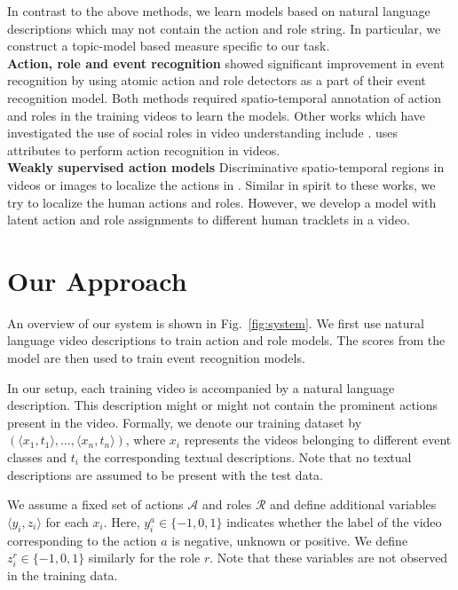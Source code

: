 \documentclass[10pt,twocolumn,letterpaper]{article}
\begin{document}
In contrast to the above methods, we learn models based on natural language
descriptions which may not contain the action and role string. In particular, we
construct a topic-model based measure specific to our task.
\\
\noindent \textbf{Action, role and event recognition} \cite{Izadinia_ECCV12,
Lan_CVPR12} showed significant improvement in event recognition by using atomic
action and role detectors as a part of their event recognition model. Both
methods required spatio-temporal annotation of action and roles in the
training videos to learn the models. Other works which have investigated the
use of social roles in video understanding include \cite{Wang_ECCV10, Fathi_CVPR12}. \cite{Liu_CVPR11} uses attributes to perform action
recognition in videos. 
\\
\noindent \textbf{Weakly supervised action models} 
Discriminative spatio-temporal regions in videos or images to localize the actions in \cite{Satkin_ECCV10, Raptis_ECCV12, Singh_ECCV12}.
Similar in spirit to these works, we try to localize the human actions and roles. 
However, we develop a model with latent action and role assignments to different human tracklets in a video.

\section{Our Approach} \label{sec:model_formualation}

An overview of our system is shown in Fig.~\ref{fig:system}. We first use
natural language video descriptions to train action and role models.  The scores
from the model are then used to train event recognition models.

In our setup, each training video is accompanied by a natural language
description. This description might or might not contain the prominent actions 
present in the video.
Formally, we denote our training dataset by
$\left(\langle x_1, t_1 \rangle, \dots , \langle x_n, t_n\rangle \right)$,
where $x_i$ represents the videos belonging to different event classes and
$t_i$ the corresponding textual descriptions. 
Note that no textual descriptions are assumed to be present with the test
data.

We assume a fixed set of actions $\mathcal{A}$ and roles $\mathcal{R}$ and define additional variables $\langle y_i, z_i \rangle$ for each $x_i$. 
Here, $y_i^a \in \{-1,0,1\}$ indicates whether the label of the video corresponding
to the action $a$ is negative, unknown or positive. We define $z_i^r \in \{-1,0,1\}$ similarly for the role $r$. 
Note that these variables are not observed in the training data.
\end{document}
